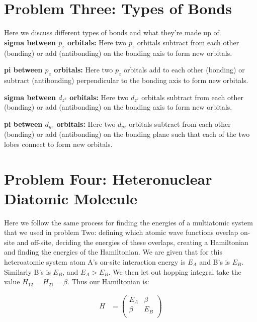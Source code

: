 \documentclass[10pt]{article} %
\begin{document}
\section{Problem Three: Types of Bonds}
Here we discuss different types of bonds and what they're made up of.\\

\textbf{sigma between $p_z$ orbitals: } Here two $p_z$ orbitals subtract from
each other (bonding) or add (antibonding) on the bonding axis to form new orbitals.\\
\vspace{3cm}

\textbf{pi between $p_z$ orbitals: } Here two $p_z$ orbitals add to each other (bonding)
or subtract (antibonding) perpendicular to the bonding axis to form new orbitals.\\
\vspace{3cm}

\textbf{sigma between $d_{z^2}$ orbitals: } Here two $d_{z^2}$ orbitals subtract from each other
(bonding) or add (antibonding) on the bonding axis to form new orbitals.\\
\vspace{3cm}

\textbf{pi between $d_{yz}$ orbitals: } Here two $d_{yz}$ orbitals subtract from each other
(bonding) or add (antibonding) on the bonding plane such that each of the two lobes
connect to form new orbitals.\\
\vspace{3cm}

\section{Problem Four: Heteronuclear Diatomic Molecule}
Here we follow the same process for finding the energies of a multiatomic system that we used
in problem Two: defining which atomic wave functions overlap on-site and off-site, deciding
the energies of these overlaps, creating a Hamiltonian and finding the energies of the
Hamiltonian. We are given that for this heteroatomic system atom A's on-site interaction
energy is $E_A$ and B's is $E_B$. Similarly B's is $E_B$, and $E_A > E_B$. We then let out
hopping integral take the value $H_{12} = H_{21} = \beta$. Thus our Hamiltonian is:

\begin{align*}
  H &=
  \begin{pmatrix}
    E_A & \beta\\
    \beta & E_B\\
  \end{pmatrix}
\end{align*}
\end{document}
